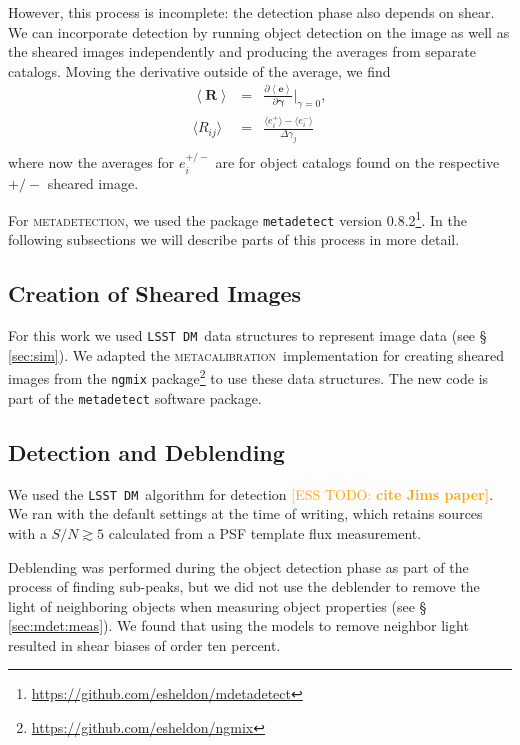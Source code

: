 \documentclass[twocolumn,twocolappendix,astrosym]{openjournal}
\newcommand{\esstodo}[1]{\textcolor{orange}{[ESS TODO: \bf #1]}}
\newcommand{\dm}{\texttt{LSST DM}}
\newcommand{\mcal}{\textsc{metacalibration}}
\newcommand{\mdet}{\textsc{metadetection}}
\begin{document}
However, this process is incomplete:  the detection phase also depends on
shear.  We can incorporate detection by running object detection on the image
as well as the sheared images independently and producing the averages from
separate catalogs.  Moving the derivative outside of the average, we find
\begin{eqnarray} \label{eq:fullR}
    \left< \boldsymbol{R} \right> &=& \frac{\partial \left< \boldsymbol{e} \right> }{\partial \boldsymbol{\gamma} } \biggr\rvert_{\gamma=0},  \nonumber \\
    \langle R_{ij}\rangle &=& \frac{\langle e_i^{+}\rangle - \langle e_i^{-}\rangle}{\Delta\gamma_j} \nonumber \\
\end{eqnarray}
where now the averages for $e_i^{+/-}$ are for object catalogs found on the
respective ${+/-}$ sheared image.

For \mdet, we used the package \texttt{metadetect} version
0.8.2\footnote{\url{https://github.com/esheldon/mdetadetect}}.  In the following subsections
we will describe parts of this process in more detail.

\subsection{Creation of Sheared Images} \label{sec:mdet:sheared}

For this work we used \dm\ data structures to represent image data (see \S
\ref{sec:sim}).  We adapted the \mcal\ implementation for creating sheared
images from the \texttt{ngmix}
package\footnote{\url{https://github.com/esheldon/ngmix}} to use these data
structures.  The new code is part of the \texttt{metadetect} software package.


\subsection{Detection and Deblending} \label{sec:mdet:detect}

We used the \dm\ algorithm for detection \esstodo{cite Jims paper}.  We ran with
the default settings at the time of writing, which retains sources with a
$S/N \gtrsim 5$ calculated from a PSF template flux measurement.

Deblending was performed during the object detection phase as part of the
process of finding sub-peaks, but we did not use the deblender to remove the
light of neighboring objects when measuring object properties (see \S
\ref{sec:mdet:meas}).  We found that using the models to remove neighbor light
resulted in shear biases of order ten percent.
\end{document}
